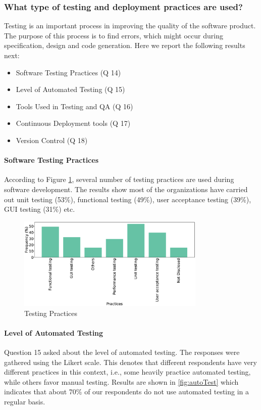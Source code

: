 \subsubsection{What type of testing and deployment practices are used?}
\label{testing_practices}

Testing is an important process in improving the quality of the software product. The purpose of this process is to find errors, which might occur during specification, design and code generation. Here we report the following results next:
\begin{itemize}
\item Software Testing Practices (Q 14)
\item Level of Automated Testing (Q 15)
\item Tools Used in Testing and QA (Q 16)
\item Continuous Deployment tools (Q 17)
\item Version Control (Q 18)
\end{itemize}


\paragraph{Software Testing Practices}
According to Figure \ref{fig:testing}, several number of testing practices are used during software development. The results show most of the organizations have carried out unit testing (53\%), functional testing (49\%), user acceptance testing (39\%), GUI testing (31\%) etc.

\begin{figure}[htbp]
\centering
  \includegraphics[width=0.8\textwidth]{Figures/Respondents_testing_practices}
  \caption{Testing Practices}
  \label{fig:testing}
\end{figure}


\paragraph{Level of Automated Testing}
Question 15 asked about the level of automated testing. The responses were gathered using the Likert scale. This denotes that different respondents have very different practices in this context, i.e., some heavily practice automated testing, while others favor manual testing.  Results are shown in \ref{fig:autoTest} which indicates that about 70\% of our respondents do not use automated testing in a regular basis.

